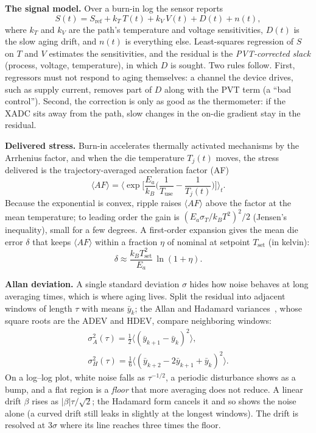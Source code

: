 \documentclass[10pt,twocolumn]{article}
\begin{document}
\textbf{The signal model.} Over a burn-in log the sensor reports
\begin{equation}
S(t)=S_{\mathrm{ref}}+k_T\,T(t)+k_V\,V(t)+D(t)+n(t),
\label{eq:model}
\end{equation}
where $k_T$ and $k_V$ are the path's temperature and voltage sensitivities, $D(t)$ is the slow aging drift, and $n(t)$ is everything else. Least-squares regression of $S$ on $T$ and $V$ estimates the sensitivities, and the residual is the \emph{PVT-corrected slack} (process, voltage, temperature), in which $D$ is sought. Two rules follow. First, regressors must not respond to aging themselves: a channel the device drives, such as supply current, removes part of $D$ along with the PVT term (a ``bad control''). Second, the correction is only as good as the thermometer: if the XADC sits away from the path, slow changes in the on-die gradient stay in the residual.

\textbf{Delivered stress.} Burn-in accelerates thermally activated mechanisms by the Arrhenius factor, and when the die temperature $T_j(t)$ moves, the stress delivered is the trajectory-averaged acceleration factor (AF)
\begin{equation}
\langle AF\rangle=\Big\langle \exp\!\Big[\frac{E_a}{k_B}\Big(\frac{1}{T_{\mathrm{use}}}-\frac{1}{T_j(t)}\Big)\Big]\Big\rangle_t .
\label{eq:af}
\end{equation}
Because the exponential is convex, ripple raises $\langle AF\rangle$ above the factor at the mean temperature; to leading order the gain is $(E_a\sigma_T/k_BT^2)^2/2$ (Jensen's inequality), small for a few degrees. A first-order expansion gives the mean die error $\delta$ that keeps $\langle AF\rangle$ within a fraction $\eta$ of nominal at setpoint $T_{\mathrm{set}}$ (in kelvin):
\begin{equation}
\delta\approx\frac{k_B T_{\mathrm{set}}^2}{E_a}\,\ln(1+\eta).
\label{eq:delta}
\end{equation}

\textbf{Allan deviation.} A single standard deviation $\sigma$ hides how noise behaves at long averaging times, which is where aging lives. Split the residual into adjacent windows of length $\tau$ with means $\bar y_k$; the Allan and Hadamard variances~\cite{allan}, whose square roots are the ADEV and HDEV, compare neighboring windows:
\begin{gather}
\sigma_A^2(\tau)=\frac{1}{2}\big\langle(\bar y_{k+1}-\bar y_k)^2\big\rangle,\nonumber\\
\sigma_H^2(\tau)=\frac{1}{6}\big\langle(\bar y_{k+2}-2\bar y_{k+1}+\bar y_k)^2\big\rangle.
\label{eq:allan}
\end{gather}
On a log--log plot, white noise falls as $\tau^{-1/2}$, a periodic disturbance shows as a bump, and a flat region is a \emph{floor} that more averaging does not reduce. A linear drift $\beta$ rises as $|\beta|\tau/\sqrt2$; the Hadamard form cancels it and so shows the noise alone (a curved drift still leaks in slightly at the longest windows). The drift is resolved at 3$\sigma$ where its line reaches three times the floor.
\end{document}
